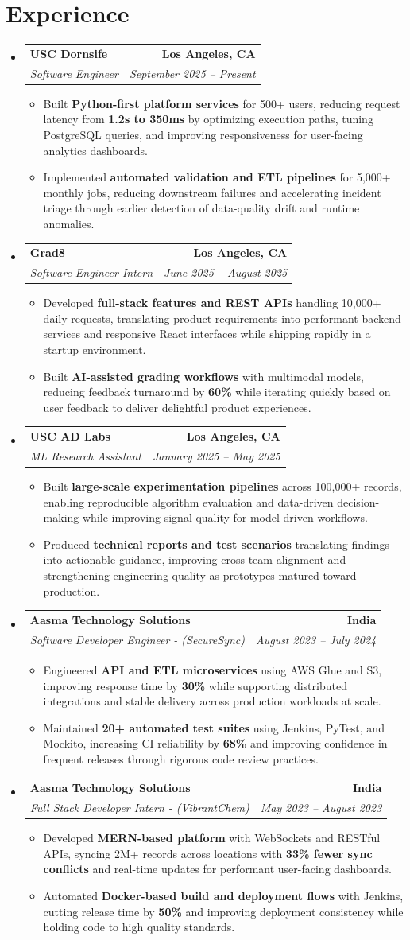 \documentclass[letterpaper,10pt]{article}
\makeatletter
\newcommand{\resumeItem}[1]{\item\small{{#1 \vspace{-2pt}}}}
\newcommand{\resumeSubheading}[4]{\vspace{-1pt}\item\begin{tabular*}{1.0\textwidth}[t]{l@{\extracolsep{\fill}}r}\textbf{#1} & \textbf{\small #2} \\\textit{\small#3} & \textit{\small #4} \\\end{tabular*}\vspace{-2pt}}
\newcommand{\resumeSubHeadingListStart}{\begin{itemize}[leftmargin=0.0in, label={}]}
\newcommand{\resumeSubHeadingListEnd}{\end{itemize}}
\newcommand{\resumeItemListStart}{\begin{itemize}[leftmargin=0.15in,label=\textbullet,itemsep=2pt,topsep=0pt,parsep=0pt,partopsep=0pt]}
\newcommand{\resumeItemListEnd}{\end{itemize}\vspace{-4pt}}
\makeatother
\begin{document}
\section{Experience}
\resumeSubHeadingListStart
\resumeSubheading{USC Dornsife}{Los Angeles, CA}{Software Engineer}{September 2025 -- Present}
\resumeItemListStart
\resumeItem{Built \textbf{Python-first platform services} for 500+ users, reducing request latency from \textbf{1.2s to 350ms} by optimizing execution paths, tuning PostgreSQL queries, and improving responsiveness for user-facing analytics dashboards.}
\resumeItem{Implemented \textbf{automated validation and ETL pipelines} for 5,000+ monthly jobs, reducing downstream failures and accelerating incident triage through earlier detection of data-quality drift and runtime anomalies.}
\resumeItemListEnd
\resumeSubheading{Grad8}{Los Angeles, CA}{Software Engineer Intern}{June 2025 -- August 2025}
\resumeItemListStart
\resumeItem{Developed \textbf{full-stack features and REST APIs} handling 10,000+ daily requests, translating product requirements into performant backend services and responsive React interfaces while shipping rapidly in a startup environment.}
\resumeItem{Built \textbf{AI-assisted grading workflows} with multimodal models, reducing feedback turnaround by \textbf{60\%} while iterating quickly based on user feedback to deliver delightful product experiences.}
\resumeItemListEnd
\resumeSubheading{USC AD Labs}{Los Angeles, CA}{ML Research Assistant}{January 2025 -- May 2025}
\resumeItemListStart
\resumeItem{Built \textbf{large-scale experimentation pipelines} across 100,000+ records, enabling reproducible algorithm evaluation and data-driven decision-making while improving signal quality for model-driven workflows.}
\resumeItem{Produced \textbf{technical reports and test scenarios} translating findings into actionable guidance, improving cross-team alignment and strengthening engineering quality as prototypes matured toward production.}
\resumeItemListEnd
\resumeSubheading{Aasma Technology Solutions}{India}{Software Developer Engineer - (SecureSync)}{August 2023 -- July 2024}
\resumeItemListStart
\resumeItem{Engineered \textbf{API and ETL microservices} using AWS Glue and S3, improving response time by \textbf{30\%} while supporting distributed integrations and stable delivery across production workloads at scale.}
\resumeItem{Maintained \textbf{20+ automated test suites} using Jenkins, PyTest, and Mockito, increasing CI reliability by \textbf{68\%} and improving confidence in frequent releases through rigorous code review practices.}
\resumeItemListEnd
\resumeSubheading{Aasma Technology Solutions}{India}{Full Stack Developer Intern - (VibrantChem)}{May 2023 -- August 2023}
\resumeItemListStart
\resumeItem{Developed \textbf{MERN-based platform} with WebSockets and RESTful APIs, syncing 2M+ records across locations with \textbf{33\% fewer sync conflicts} and real-time updates for performant user-facing dashboards.}
\resumeItem{Automated \textbf{Docker-based build and deployment flows} with Jenkins, cutting release time by \textbf{50\%} and improving deployment consistency while holding code to high quality standards.}
\resumeItemListEnd
\resumeSubHeadingListEnd
\vspace{-14pt}
\end{document}
